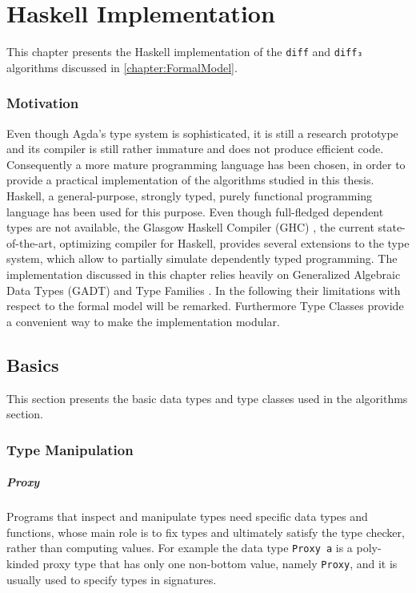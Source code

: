 \documentclass[../Thesis.tex]{subfiles}
\begin{document}
\chapter{Haskell Implementation}
This chapter presents the Haskell implementation of the \texttt{diff}
and \texttt{diff₃} algorithms discussed in \ref{chapter:FormalModel}.

	\subsection*{Motivation}
	Even though Agda's type system is sophisticated, it is still a research 
	prototype and its compiler is still rather immature and does not produce
	efficient code. Consequently a more mature programming language has been 
	chosen, in order to provide a practical implementation of
	the algorithms studied in this thesis.
	Haskell, a general-purpose, strongly typed, purely functional 
	programming language \cite{Hudak07ahistory, Marlow_haskell2010} 
	has been used for this purpose.
	Even though full-fledged dependent types are not available, the 
	Glasgow Haskell Compiler (GHC) \cite{GHC}, the current state-of-the-art, 
	optimizing compiler for Haskell, provides several extensions to the type
	system, which allow to partially simulate dependently typed programming.
	The implementation discussed in this chapter 
	relies heavily on Generalized Algebraic Data Types 
	(GADT) \cite{JonWasWei04,PeytonJonesSUT,SchGADT} and Type Families
	\cite{ChakATC,ChakATS,SchrTCO,SchrTOT,Kiselyov09funwith}.
	In the following their limitations with respect to the formal model will be 
	remarked.
	Furthermore Type Classes provide a convenient way to make the 
	implementation modular.

	
	\section{Basics}
	This section presents the basic data types and type classes used 
	in the algorithms section.

	\subsection{Type Manipulation}

	\paragraph{Proxy}
	Programs that inspect and manipulate types need specific data types
	and functions, whose main role is to fix types and 
	ultimately satisfy the type checker, rather than computing values.
	For example the data type \texttt{Proxy a} is a poly-kinded proxy type that 
	has only one non-bottom value, namely \texttt{Proxy}, and it
	is usually used to specify types in signatures.
	
\end{document}
